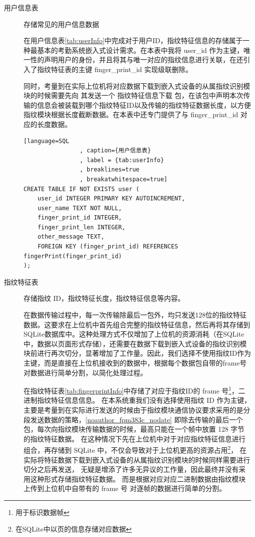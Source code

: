     \begin{description}
        \item[用户信息表] 存储常见的用户信息数据

            在用户信息表\ref{tab:userInfo}中完成对于用户ID，指纹特征信息的存储属于一种最基本的考勤系统嵌入式设计需求。在本表中我将 user\_id 作为主键，唯一性的声明用户的身份，并且将其与唯一对应的指纹信息进行关联，在还引入了指纹特征表的主键 finger\_print\_id 实现级联删除。

            同时，考量到在实际上位机将对应数据下载到嵌入式设备的从属指纹识别模块的时候需要先向
            其发送一个 指纹特征信息下载 包，在该包中声明本次传输的信息会被装载到哪个指纹特征ID以及传输的指纹特征数据长度，以方便指纹模块根据长度截断数据。在本表中还专门提供了与
            finger\_print\_id 对应的长度数据。

            \begin{lstlisting}[language=SQL
                , caption={用户信息表}
                , label = {tab:userInfo}
                , breaklines=true
                , breakatwhitespace=true]
CREATE TABLE IF NOT EXISTS user (
    user_id INTEGER PRIMARY KEY AUTOINCREMENT,
    user_name TEXT NOT NULL,
    finger_print_id INTEGER,
    finger_print_len INTEGER,
    other_message TEXT,
    FOREIGN KEY (finger_print_id) REFERENCES fingerPrint(finger_print_id)
);
            \end{lstlisting}

        \item[指纹特征表] 存储指纹 ID，指纹特征长度，指纹特征信息等内容。
        
            在数据传输过程中，每一次传输除最后一包外，均只发送128位的指纹特征数据。这要求在上位机中首先组合完整的指纹特征信息，然后再将其存储到SQLite数据库中。这种处理方式不仅增加了上位机的资源消耗（在SQLite中，数据以页面形式存储），还需要在数据下载到嵌入式设备的指纹识别模块前进行再次切分，显著增加了工作量。因此，我们选择不使用指纹ID作为主键，而是直接在上位机接收到的数据中，根据每个数据包自带的frame号对数据进行简单分割，以简化处理过程。
        
            在指纹特征表\ref{tab:fingerprintInfo}中存储了对应于指纹ID的 frame 号\footnote{用于标识数据帧}，二进制指纹特征信息信息。
            在本系统重我们没有选择使用指纹 ID 作为主键，主要是考量到在实际进行发送的时候由于指纹模块通信协议要求采用的是分段发送数据的策略，\ref{noauthor_fpm383c_nodate}
            即除去传输的最后一个包，每次向指纹模块传输数据的时候，最高只能在一个帧中放置 128 字节的指纹特征数据。
            在这种情况下先在上位机中对于对应指纹特征信息进行组合，再存储到 SQLite 中，不仅会导致对于上位机更高的资源占用\footnote{在SQLite中以页的信息存储对应数据}，
            在实际将特征数据下载到嵌入式设备的从属指纹识别模块的时候同样需要进行切分之后再发送，
            无疑是增添了许多无异议的工作量，因此最终并没有采用这种形式存储指纹特征数据。
            而是根据对应对应二进制数据由指纹模块上传到上位机中自带有的 frame 号 对逐帧的数据进行简单的分割。


\end{description}
